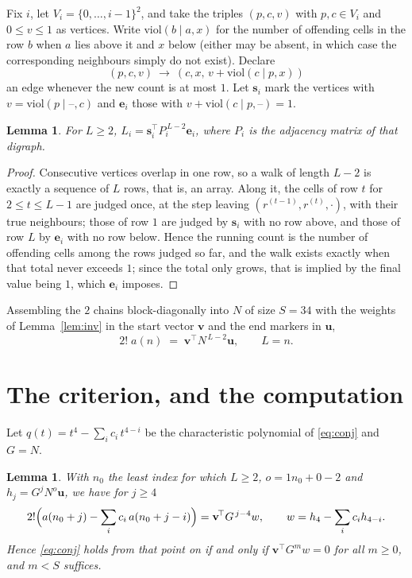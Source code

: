 \documentclass[11pt,a4paper]{article}
\theoremstyle{plain}
\newtheorem{lemma}[theorem]{Lemma}
\theoremstyle{definition}
\begin{document}
Fix $i$, let $V_i=\{0,\dots,i-1\}^{2}$, and take the triples $(p,c,v)$ with
$p,c\in V_i$ and $0\le v\le1$ as vertices. Write $\mathrm{viol}(b\mid a,x)$ for the number
of offending cells in the row $b$ when $a$ lies above it and $x$ below (either may be
absent, in which case the corresponding neighbours simply do not exist). Declare
\[
(p,c,v)\ \longrightarrow\ (c,x,\,v+\mathrm{viol}(c\mid p,x))
\]
an edge whenever the new count is at most $1$. Let $\mathbf{s}_i$ mark the vertices with
$v=\mathrm{viol}(p\mid\text{--},c)$ and $\mathbf{e}_i$ those with
$v+\mathrm{viol}(c\mid p,\text{--})=1$.

\begin{lemma}\label{lem:walk}
For $L\ge2$, $L_i=\mathbf{s}_i^{\!\top}P_i^{\,L-2}\mathbf{e}_i$, where $P_i$ is the
adjacency matrix of that digraph.
\end{lemma}

\begin{proof}
Consecutive vertices overlap in one row, so a walk of length $L-2$ is exactly a sequence
of $L$ rows, that is, an array. Along it, the cells of row $t$ for $2\le t\le L-1$ are
judged once, at the step leaving $(r^{(t-1)},r^{(t)},\cdot)$, with their true neighbours;
those of row $1$ are judged by $\mathbf{s}_i$ with no row above, and those of row
$L$ by $\mathbf{e}_i$ with no row below. Hence the running count is the number of
offending cells among the rows judged so far, and the walk exists exactly when that total
never exceeds $1$; since the total only grows, that is implied by the final value being
$1$, which $\mathbf{e}_i$ imposes.
\end{proof}

Assembling the $2$ chains block-diagonally into $N$ of size $S=34$ with the weights of
Lemma~\ref{lem:inv} in the start vector $\mathbf{v}$ and the end markers in
$\mathbf{u}$,
\begin{equation}\label{eq:walk2}
2!\;a(n)\;=\;\mathbf{v}^{\!\top}N^{\,L-2}\mathbf{u},\qquad L=n .
\end{equation}

\section{The criterion, and the computation}

Let $q(t)=t^{4}-\sum_i c_i\,t^{4-i}$ be the characteristic polynomial of
\eqref{eq:conj} and $G=N$.

\begin{lemma}\label{lem:crit}
With $n_0$ the least index for which $L\ge2$, $o=1n_0+0-2$ and
$h_j=G^{j}N^{o}\mathbf{u}$, we have for $j\ge4$
\[
2!\Bigl(a(n_0+j)-\sum_i c_i\,a(n_0+j-i)\Bigr)=\mathbf{v}^{\!\top}G^{\,j-4}w,
\qquad w=h_{4}-\sum_i c_i h_{4-i} .
\]
Hence \eqref{eq:conj} holds from that point on if and only if
$\mathbf{v}^{\!\top}G^{m}w=0$ for all $m\ge0$, and $m<S$ suffices.
\end{lemma}
\end{document}
